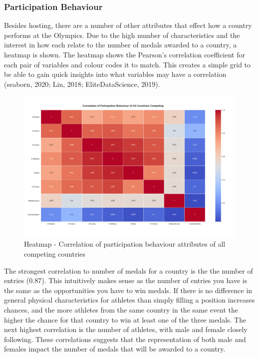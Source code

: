 \documentclass[a4 paper, 12pt]{article}
\begin{document}
        \subsubsection{Participation Behaviour}
        Besides hosting, there are a number of other attributes that effect how a country performs at the Olympics. Due to the high number of characteristics and the interest in how each relate to the number of medals awarded to a country, a heatmap is shown. The heatmap shows the Pearson's correlation coefficient for each pair of variables and colour codes it to match. This creates a simple grid to be able to gain quick insights into what variables may have a correlation (seaborn, 2020; Lin, 2018; EliteDataScience, 2019).

        \begin{figure} [H]
            \centering
            \includegraphics[width=\textwidth, frame]
                {./images/graph/countries_stats_heatmap.png}      
                \caption{Heatmap - Correlation of participation behaviour attributes of all competing countries} 
        \end{figure}

        The strongest correlation to number of medals for a country is the the number of entries (0.87). This intuitively makes sense as the number of entries you have is the same as the opportunities you have to win medals. If there is no difference in general physical characteristics for athletes than simply filling a position increases chances, and the more athletes from the same country in the same event the higher the chance for that country to win at least one of the three medals. The next highest correlation is the number of athletes, with male and female closely following. These correlations suggests that the representation of both male and females impact the number of medals that will be awarded to a country. 
        
\end{document}

